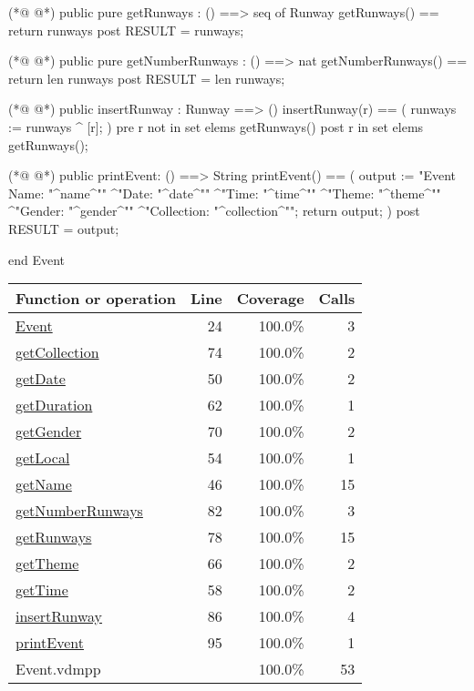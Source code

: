 \begin{vdmpp}[breaklines=true]
(*@
\label{getRunways:78}
@*)
  public pure getRunways : () ==> seq of Runway
     getRunways() == return runways
  post RESULT = runways;
  
(*@
\label{getNumberRunways:82}
@*)
  public pure getNumberRunways : () ==> nat
     getNumberRunways() == return len runways
  post RESULT = len runways;
     
(*@
\label{insertRunway:86}
@*)
  public insertRunway : Runway ==> ()
   insertRunway(r) ==
   (
     runways := runways ^  [r];
   )
   pre r not in set elems getRunways()
   post r  in set elems getRunways();
   
  
(*@
\label{printEvent:95}
@*)
  public printEvent: () ==> String
  printEvent() == (
  output := "Event Name: "^name^"\n"
       ^"Date: "^date^"\n"
       ^"Time: "^time^"\n"
       ^"Theme: "^theme^"\n"
       ^"Gender: "^gender^"\n"
       ^"Collection: "^collection^"\n";
  return output;
  )
  post RESULT = output;
  
end Event
\end{vdmpp}
\bigskip
\begin{longtable}{|l|r|r|r|}
\hline
Function or operation & Line & Coverage & Calls \\
\hline
\hline
\hyperref[Event:24]{Event} & 24&100.0\% & 3 \\
\hline
\hyperref[getCollection:74]{getCollection} & 74&100.0\% & 2 \\
\hline
\hyperref[getDate:50]{getDate} & 50&100.0\% & 2 \\
\hline
\hyperref[getDuration:62]{getDuration} & 62&100.0\% & 1 \\
\hline
\hyperref[getGender:70]{getGender} & 70&100.0\% & 2 \\
\hline
\hyperref[getLocal:54]{getLocal} & 54&100.0\% & 1 \\
\hline
\hyperref[getName:46]{getName} & 46&100.0\% & 15 \\
\hline
\hyperref[getNumberRunways:82]{getNumberRunways} & 82&100.0\% & 3 \\
\hline
\hyperref[getRunways:78]{getRunways} & 78&100.0\% & 15 \\
\hline
\hyperref[getTheme:66]{getTheme} & 66&100.0\% & 2 \\
\hline
\hyperref[getTime:58]{getTime} & 58&100.0\% & 2 \\
\hline
\hyperref[insertRunway:86]{insertRunway} & 86&100.0\% & 4 \\
\hline
\hyperref[printEvent:95]{printEvent} & 95&100.0\% & 1 \\
\hline
\hline
Event.vdmpp & & 100.0\% & 53 \\
\hline
\end{longtable}

